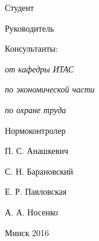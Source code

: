 \begin{minipage}{.6\textwidth}
Студент

Руководитель

Консультанты:

\hspace{0.3em} \textit{от кафедры ИТАС}

\hspace{0.3em} \textit{по экономической части}

\hspace{0.3em} \textit{по охране труда}

Нормоконтролер

\smallskip
\color{white}{Рецензент}
\end{minipage}
\hfill
\begin{minipage}{.3\textwidth}
  П. С. Анашкевич

  С. Н. Барановский

  \vspace{\baselineskip}
  Е. Р. Павловская

  А. А. Носенко

  \color{white}{???}

  \color{black}{Е. В. Протченко}

  \smallskip

  \color{white}{???}
\end{minipage}

\vfill

{\centering{}
  Минск 2016\par
}

\setlength{\parindent}{1.25cm} %
